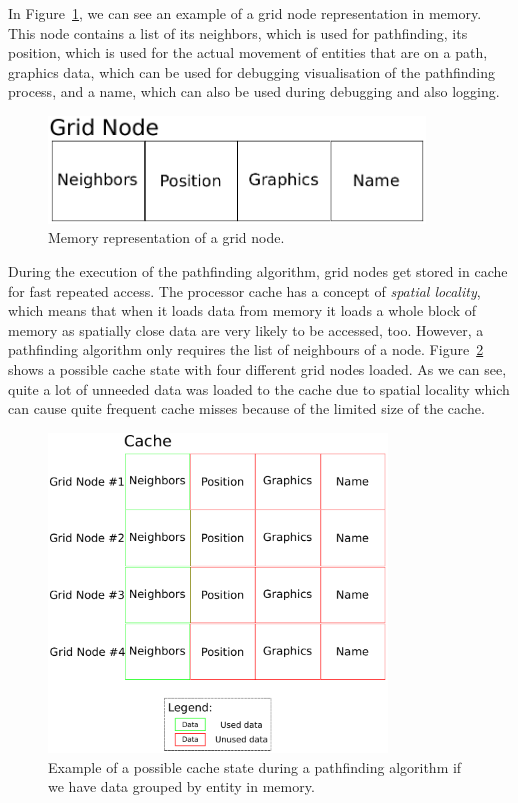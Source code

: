 In Figure~\ref{grid-node}, we can see an example of a grid node representation in memory. This node contains a list of its neighbors,
which is used for pathfinding, its position, which is used for the actual movement of entities that are on a path, graphics data,
which can be used for debugging visualisation of the pathfinding process, and a name, which can also be used during debugging and also
logging.

\begin{figure}[H]
    \centering
    \includegraphics[width=10cm]{../img/grid-node.pdf}
    \caption{Memory representation of a grid node.}
    \label{grid-node}
\end{figure}

During the execution of the pathfinding algorithm, grid nodes get stored in cache for fast repeated access. The processor cache has a
concept of \emph{spatial locality}, which means that when it loads data from memory it loads a whole block of memory as spatially close
data are very likely to be accessed, too. However, a pathfinding algorithm only requires the list of neighbours of a node.
Figure~\ref{cache-inheritance} shows a possible cache state with four different grid nodes loaded. As we can see, quite a lot of unneeded
data was loaded to the cache due to spatial locality which can cause quite frequent cache misses because of the limited size of the cache.

\begin{figure}[H]
    \centering
    \includegraphics[width=9cm]{../img/grid-cache-inheritance.pdf}
    \caption{Example of a possible cache state during a pathfinding algorithm if we have data grouped by entity in memory.}
    \label{cache-inheritance}
\end{figure}

